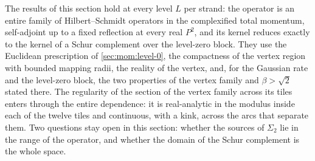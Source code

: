 The results of this section hold at every level $L$ per strand: the operator is an entire family of Hilbert--Schmidt operators in the complexified total momentum, self-adjoint up to a fixed reflection at every real $P^2$, and its kernel reduces exactly to the kernel of a Schur complement over the level-zero block.
They use the Euclidean prescription of \cref{sec:mom:level-0}, the compactness of the vertex region with bounded mapping radii, the reality of the vertex, and, for the Gaussian rate and the level-zero block, the two properties of the vertex family and $\beta > \sqrt{2}$ stated there.
The regularity of the section of the vertex family across its tiles enters through the entire dependence: it is real-analytic in the modulus inside each of the twelve tiles and continuous, with a kink, across the arcs that separate them.
Two questions stay open in this section: whether the sources of $\Sigma_2$ lie in the range of the operator, and whether the domain of the Schur complement is the whole space.

